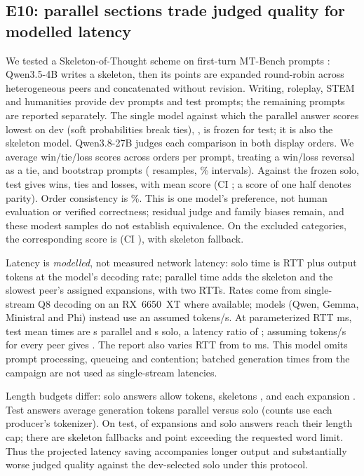 \documentclass[11pt]{article}
\theoremstyle{definition}
\theoremstyle{remark}
\begin{document}
\subsection{E10: parallel sections trade judged quality for modelled latency}\label{sec:e10}
We tested a Skeleton-of-Thought scheme \cite{ning2023skeleton} on first-turn MT-Bench prompts
\cite{zheng2023judging}: Qwen3.5-4B writes a
skeleton, then its points are expanded round-robin across \eTenPeers{} heterogeneous peers and
concatenated without revision. Writing, roleplay, STEM and humanities provide \eTenDevN{} dev
prompts and \eTenTestN{} test prompts; the remaining \eTenOtherN{} prompts are reported separately.
The single model against which the parallel answer scores lowest on dev (soft probabilities break
ties), \eTenBestName{}, is frozen for test; it is also the skeleton model.
Qwen3.8-27B judges each comparison in both display orders. We average win/tie/loss scores across
orders per prompt, treating a win/loss reversal as a tie, and bootstrap prompts
(\eTenBoot{} resamples, \eTenCILevel\% intervals). Against the frozen solo, test gives
\eTenTestWin{} wins, \eTenTestTie{} ties and \eTenTestLoss{} losses, with mean score
\eTenTestScore{} (CI \eTenTestScoreCI; a score of one half denotes parity).
Order consistency is \eTenTestConsistency\%. This is one model's preference, not human evaluation
or verified correctness; residual judge and family biases remain, and these modest samples do not
establish equivalence. On the excluded categories, the corresponding score is
\eTenOtherScore{} (CI \eTenOtherScoreCI), with \eTenOtherFallback{} skeleton fallback.

Latency is \emph{modelled}, not measured network latency: solo time is RTT plus output tokens
at the model's decoding rate; parallel time adds the skeleton and the slowest peer's assigned
expansions, with two RTTs. Rates come from single-stream Q8 decoding on an RX~6650~XT where available;
\eTenDefaulted{} models (Qwen, Gemma, Ministral and Phi) instead use an assumed
\eTenDefaultSpeed{} tokens/s. At parameterized RTT \eTenRttMid{} ms, test mean times are
\eTenTestSeconds{} s parallel and \eTenTestSoloSeconds{} s solo, a latency ratio of
\eTenTestSpeedup{}; assuming \eTenUniformSpeed{} tokens/s for every peer gives
\eTenTestUniformSpeedup{}. The report also varies RTT from \eTenRttLow{} to \eTenRttHigh{} ms.
This model omits prompt processing, queueing and contention; batched generation times from the
campaign are not used as single-stream latencies.

Length budgets differ: solo answers allow \eTenBaselineBudget{} tokens, skeletons
\eTenOutlineBudget{}, and each expansion \eTenExpandBudget{}. Test answers average
\eTenTestTokens{} generation tokens parallel versus \eTenTestSoloTokens{} solo
(counts use each producer's tokenizer). On test, \eTenTestCut{} of \eTenTestExpansions{}
expansions and \eTenTestSoloCut{} solo answers reach their length cap; there are
\eTenTestFallback{} skeleton fallbacks and \eTenTestLongPoints{} point exceeding the requested
word limit. Thus the projected latency saving accompanies longer output and substantially worse
judged quality against the dev-selected solo under this protocol.
\end{document}

